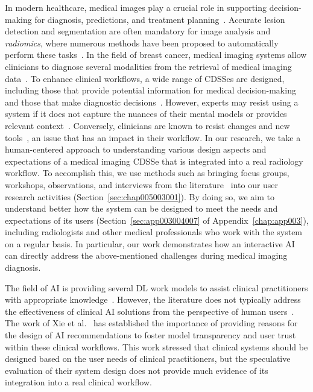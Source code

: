 In modern healthcare, medical images play a crucial role in supporting decision-making for diagnosis, predictions, and treatment planning~\cite{liang2019deep}.
Accurate lesion detection and segmentation are often mandatory for image analysis and {\it radiomics}, where numerous methods have been proposed to automatically perform these tasks~\cite{litjens2017survey}.
In the field of breast cancer, medical imaging systems allow clinicians to diagnose several modalities from the retrieval of medical imaging data~\cite{seifabadi2019correlation}.
To enhance clinical workflows, a wide range of \acp{CDSSe} are designed, including those that provide potential information for medical decision-making and those that make diagnostic decisions~\cite{10.1145/3290605.3300234, GU2020101858}.
However, experts may resist using a system if it does not capture the nuances of their mental models or provides relevant context~\cite{yang2016investigating}.
Conversely, clinicians are known to resist changes and new tools~\cite{10.1145/3132272.3134111}, an issue that has an impact in their workflow.
In our research, we take a human-centered approach to understanding various design aspects and expectations of a medical imaging \ac{CDSSe} that is integrated into a real radiology workflow.
To accomplish this, we use methods such as bringing focus groups, workshops, observations, and interviews from the literature~\cite{Lim:2019:DDI:3319806.3301427} into our user research activities (Section~\ref{sec:chap005003001}).
By doing so, we aim to understand better how the system can be designed to meet the needs and expectations of its users (Section~\ref{sec:app003004007} of Appendix~\ref{chap:app003}), including radiologists and other medical professionals who work with the system on a regular basis.
In particular, our work demonstrates how an interactive \ac{AI} can directly address the above-mentioned challenges during medical imaging diagnosis.

The field of \ac{AI} is providing several \ac{DL} work models to assist clinical practitioners with appropriate knowledge~\cite{9540298, 9730804}.
However, the literature does not typically address the effectiveness of clinical \ac{AI} solutions from the perspective of human users~\cite{CALISTO2021102607}.
The work of Xie et al.~\cite{10.1145/3313831.3376807} has established the importance of providing reasons for the design of \ac{AI} recommendations to foster model transparency and user trust within these clinical workflows.
This work stressed that clinical systems should be designed based on the user needs of clinical practitioners, but the speculative evaluation of their system design does not provide much evidence of its integration into a real clinical workflow.

